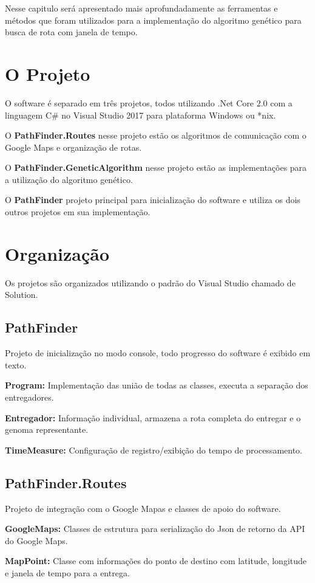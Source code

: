 Nesse capitulo será apresentado mais aprofundadamente as ferramentas e métodos que foram utilizados para a implementação do algoritmo genético para busca de rota com janela de tempo.
 
\section{O Projeto}
O software é separado em três projetos, todos utilizando .Net Core 2.0 com a linguagem C\# no Visual Studio 2017 para plataforma Windows ou \**nix.

O \textbf{PathFinder.Routes} nesse projeto estão os algoritmos de comunicação com o Google Maps e organização de rotas.

O \textbf{PathFinder.GeneticAlgorithm} nesse projeto estão as implementações para a utilização do algoritmo genético.

O \textbf{PathFinder} projeto principal para inicialização do software e utiliza os dois outros projetos em sua implementação.

\section{Organização}
Os projetos são organizados utilizando o padrão do Visual Studio chamado de Solution.

\subsection{PathFinder}
Projeto de inicialização no modo console, todo progresso do software é exibido em texto.

\textbf{Program:} Implementação das união de todas as classes, executa a separação dos entregadores.

\textbf{Entregador:} Informação individual, armazena a rota completa do entregar e o genoma representante.

\textbf{TimeMeasure:} Configuração de registro/exibição do tempo de processamento.
\subsection{PathFinder.Routes}

Projeto de integração com o Google Mapas e classes de apoio do software.

\textbf{GoogleMaps:} Classes de estrutura para serialização do Json de retorno da API do Google Maps.

\textbf{MapPoint:} Classe com informações do ponto de destino com latitude, longitude e janela de tempo para a entrega.

